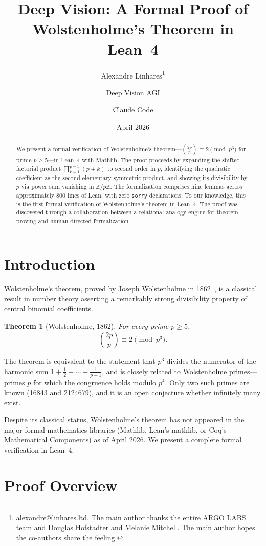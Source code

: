 \documentclass[11pt]{article}
\title{Deep Vision: A Formal Proof of Wolstenholme's Theorem in Lean~4}
\author{Alexandre Linhares\thanks{alexandre@linhares.ltd. The main author thanks the entire ARGO LABS team and Douglas Hofstadter and Melanie Mitchell. The main author hopes the co-authors share the feeling.} \and Deep Vision AGI \and Claude Code}
\date{April 2026}
\newtheorem{theorem}{Theorem}
\theoremstyle{definition}
\theoremstyle{remark}
\begin{document}
\maketitle

\begin{abstract}
We present a formal verification of Wolstenholme's theorem---$\binom{2p}{p} \equiv 2 \pmod{p^3}$ for prime $p \geq 5$---in Lean~4 with Mathlib.
The proof proceeds by expanding the shifted factorial product $\prod_{k=1}^{p-1}(p+k)$ to second order in $p$, identifying the quadratic coefficient as the second elementary symmetric product, and showing its divisibility by $p$ via power sum vanishing in $\mathbb{Z}/p\mathbb{Z}$.
The formalization comprises nine lemmas across approximately 800 lines of Lean, with zero \texttt{sorry} declarations.
To our knowledge, this is the first formal verification of Wolstenholme's theorem in Lean~4.
The proof was discovered through a collaboration between a relational analogy engine for theorem proving and human-directed formalization.
\end{abstract}

\section{Introduction}

Wolstenholme's theorem, proved by Joseph Wolstenholme in 1862~\cite{wolstenholme1862}, is a classical result in number theory asserting a remarkably strong divisibility property of central binomial coefficients.

\begin{theorem}[Wolstenholme, 1862]\label{thm:main}
For every prime $p \geq 5$,
\[
\binom{2p}{p} \equiv 2 \pmod{p^3}.
\]
\end{theorem}

The theorem is equivalent to the statement that $p^3$ divides the numerator of the harmonic sum $1 + \frac{1}{2} + \cdots + \frac{1}{p-1}$, and is closely related to Wolstenholme primes---primes $p$ for which the congruence holds modulo $p^4$. Only two such primes are known (16843 and 2124679), and it is an open conjecture whether infinitely many exist.

Despite its classical status, Wolstenholme's theorem has not appeared in the major formal mathematics libraries (Mathlib, Lean's mathlib, or Coq's Mathematical Components) as of April 2026. We present a complete formal verification in Lean~4.

\section{Proof Overview}
\end{document}
